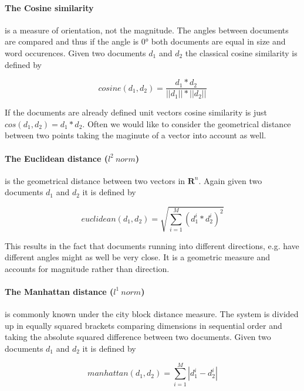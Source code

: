     \paragraph{The Cosine similarity} is a measure of orientation, not the magnitude. The angles between documents are compared and thus if the angle is $0°$ both documents are equal in size and word occurences. Given two documents $d_1$ and $d_2$ the classical cosine similarity is defined by

    \begin{equation}
      cosine(d_1, d_2) = \frac{d_1 * d_2}{||d_1|| * ||d_2||}
    \end{equation}

    If the documents are already defined unit vectors cosine similarity is just $cos(d_1, d_2) = d_1 * d_2$. Often we would like to consider the geometrical distance between two points taking the maginute of a vector into account as well.

    \paragraph{The Euclidean distance ($l^2\:norm$)} is the geometrical distance between two vectors in $\mathbf{R}^n$. Again given two documents $d_1$ and $d_2$ it is defined by

    \begin{equation}
      euclidean(d_1, d_2) = \sqrt{\sum_{i=1}^{M}(d_1^i * d_2^i)^2}
    \end{equation}

    This results in the fact that documents running into different directions, e.g. have different angles might as well be very close. It is a geometric measure and accounts for magnitude rather than direction.

    \paragraph{The Manhattan distance ($l^1\:norm$)} is commonly known under the city block distance measure. The system is divided up in equally squared brackets comparing dimensions in sequential order and taking the absolute squared difference between two documents. Given two documents $d_1$ and $d_2$ it is defined by

    \begin{equation}
      manhattan(d_1, d_2) = \sum_{i=1}^{M}|d_1^i - d_2^i|
    \end{equation}

